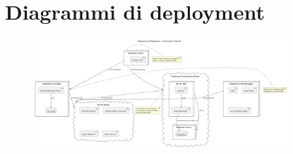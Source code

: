\documentclass[12pt,a4paper,oneside]{report}
\begin{document}
\section{Diagrammi di deployment}
\begin{figure}[H]
    \centering
    \includegraphics[width=0.85\textwidth]{images/uml/InfrastructureDeployment.png}
\end{figure}
\end{document}
